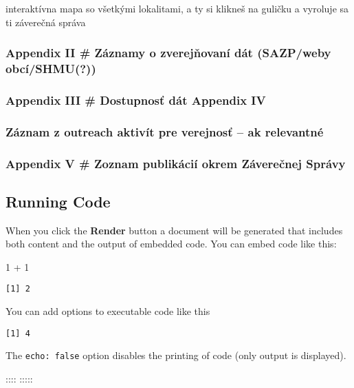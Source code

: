 \documentclass[
  slovak,
  letterpaper,
  DIV=11,
  numbers=noendperiod]{scrartcl}
\newenvironment{Shaded}{\begin{snugshade}}{\end{snugshade}}
\newcommand{\DecValTok}[1]{\textcolor[rgb]{0.68,0.00,0.00}{#1}}
\newcommand{\SpecialCharTok}[1]{\textcolor[rgb]{0.37,0.37,0.37}{#1}}
\begin{document}
interaktívna mapa so všetkými lokalitami, a ty si klikneš na guličku a
vyroluje sa ti záverečná správa

\subsubsection{Appendix II \# Záznamy o zverejňovaní dát (SAZP/weby
obcí/SHMU(?))}\label{appendix-ii-zuxe1znamy-o-zverejux148ovanuxed-duxe1t-sazpweby-obcuxedshmu}

\subsubsection{\texorpdfstring{Appendix III \# Dostupnosť dát Appendix
IV\\
}{Appendix III \# Dostupnosť dát Appendix IV }}\label{appendix-iii-dostupnosux165-duxe1t-appendix-iv}

\subsubsection{Záznam z outreach aktivít pre verejnosť -- ak
relevantné}\label{zuxe1znam-z-outreach-aktivuxedt-pre-verejnosux165-ak-relevantnuxe9}

\subsubsection{Appendix V \# Zoznam publikácií okrem Záverečnej
Správy}\label{appendix-v-zoznam-publikuxe1ciuxed-okrem-zuxe1vereux10dnej-spruxe1vy}

\subsection{Running Code}\label{running-code}

When you click the \textbf{Render} button a document will be generated
that includes both content and the output of embedded code. You can
embed code like this:

\begin{Shaded}
\begin{Highlighting}[]
\DecValTok{1} \SpecialCharTok{+} \DecValTok{1}
\end{Highlighting}
\end{Shaded}

\begin{verbatim}
[1] 2
\end{verbatim}

You can add options to executable code like this

\begin{verbatim}
[1] 4
\end{verbatim}

The \texttt{echo:\ false} option disables the printing of code (only
output is displayed).

:::: :::::
\end{document}
